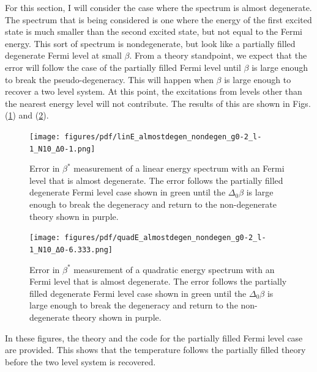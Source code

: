 For this section, I will consider the case where the spectrum is almost degenerate. The spectrum that is being considered is one where the energy of the first excited state is much smaller than the second excited state, but not equal to the Fermi energy. This sort of spectrum is nondegenerate, but look like a partially filled degenerate Fermi level at small $\beta$. From a theory standpoint, we expect that the error will follow the case of the partially filled Fermi level until $\beta$ is large enough to break the pseudo-degeneracy. This will happen when $\beta$ is large enough to recover a two level system. At this point, the excitations from levels other than the nearest energy level will not contribute. The results of this are shown in Figs.\@ (\ref{fig:linE_almostdegen}) and (\ref{fig:quadE_almostdegen}). 
\begin{figure}[H]
    \centering
    \texttt{[image: figures/pdf/linE\_almostdegen\_nondegen\_g0-2\_l-1\_N10\_Δ0-1.png]}
    \caption{Error in $\beta^*$ measurement of a linear energy spectrum with an Fermi level that is almost degenerate. The error follows the partially filled degenerate Fermi level case shown in green until the $\Delta_0 \beta$ is large enough to break the degeneracy and return to the non-degenerate theory shown in purple.}
    \label{fig:linE_almostdegen}
\end{figure}

\begin{figure}[H]
    \centering
    \texttt{[image: figures/pdf/quadE\_almostdegen\_nondegen\_g0-2\_l-1\_N10\_Δ0-6.333.png]}
    \caption{Error in $\beta^*$ measurement of a quadratic energy spectrum with an Fermi level that is almost degenerate. The error follows the partially filled degenerate Fermi level case shown in green until the $\Delta_0 \beta$ is large enough to break the degeneracy and return to the non-degenerate theory shown in purple.}
    \label{fig:quadE_almostdegen}
\end{figure}
In these figures, the theory and the code for the partially filled Fermi level case are provided. This shows that the temperature follows the partially filled theory before the two level system is recovered.
